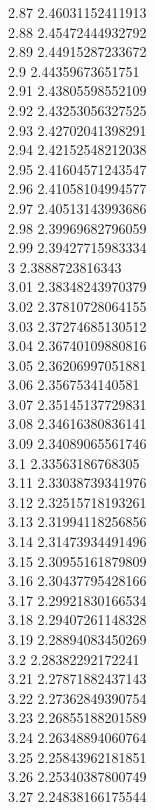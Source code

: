 {2.87	2.46031152411913\\
2.88	2.45472444932792\\
2.89	2.44915287233672\\
2.9	2.44359673651751\\
2.91	2.43805598552109\\
2.92	2.43253056327525\\
2.93	2.42702041398291\\
2.94	2.42152548212038\\
2.95	2.41604571243547\\
2.96	2.41058104994577\\
2.97	2.40513143993686\\
2.98	2.39969682796059\\
2.99	2.39427715983334\\
3	2.3888723816343\\
3.01	2.38348243970379\\
3.02	2.37810728064155\\
3.03	2.37274685130512\\
3.04	2.36740109880816\\
3.05	2.36206997051881\\
3.06	2.3567534140581\\
3.07	2.35145137729831\\
3.08	2.34616380836141\\
3.09	2.34089065561746\\
3.1	2.33563186768305\\
3.11	2.33038739341976\\
3.12	2.32515718193261\\
3.13	2.31994118256856\\
3.14	2.31473934491496\\
3.15	2.30955161879809\\
3.16	2.30437795428166\\
3.17	2.29921830166534\\
3.18	2.29407261148328\\
3.19	2.28894083450269\\
3.2	2.28382292172241\\
3.21	2.27871882437143\\
3.22	2.27362849390754\\
3.23	2.26855188201589\\
3.24	2.26348894060764\\
3.25	2.25843962181851\\
3.26	2.25340387800749\\
3.27	2.24838166175544\\
}

